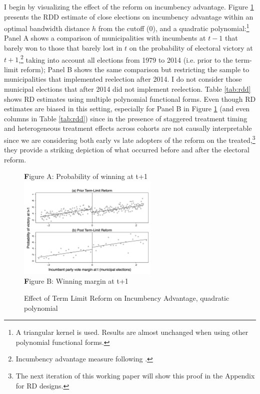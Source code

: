\documentclass[12pt]{amsart}
\numberwithin{equation}{section}
\theoremstyle{definition}
\theoremstyle{definition}
\theoremstyle{definition}
\begin{document}
\begin{appendix}
I begin by visualizing the effect of the reform on incumbency advantage.  Figure \ref{fig:incumbency_advantage} presents the RDD estimate of close elections on incumbency advantage  within an optimal bandwidth distance $h$ from the cutoff (0), and a quadratic polynomial:\footnote{A triangular kernel is used. Results are almost unchanged when using other polynomial functional forms.} Panel A shows a comparison of municipalities with incumbents at $t-1$ that barely won to those that barely lost in $t$ on the probability of electoral victory at $t+1$,\footnote{Incumbency advantage measure following \citet{klasnja_titiunik_2017}.} taking into account all elections from 1979 to 2014 (i.e. prior to the term-limit reform); Panel B shows the same comparison but restricting the sample to municipalities that implemented reelection after 2014. I do not consider those municipal elections that after 2014 did not implement reelection. Table \ref{tab:rdd} shows RD estimates using multiple polynomial functional forms. Even though RD estimates are biased in this setting, especially for Panel B in Figure \ref{fig:incumbency_advantage} (and even columns in Table \ref{tab:rdd}) since in the presence of staggered treatment timing and heterogeneous treatment effects across cohorts are not causally interpretable since we are considering both early vs late adopters of the reform on the treated,\footnote{The next iteration of this working paper will show this proof in the Appendix for RD designs.} they provide a striking depiction of what occurred before and after the electoral reform. 


\begin{figure}[H]
\centering
\caption{Effect of Term Limit Reform on Incumbency Advantage, quadratic polynomial}
  \label{fig:incumbency_advantage} 

	{\textbf Figure A: Probability of winning at t+1}
	 \includegraphics[width=0.6\textwidth]{../Figures_incumbency/RDD_incumbency_pol2.png}
	 \\
	{\textbf Figure B: Winning margin at t+1}


\end{figure}
\end{appendix}
\end{document}
